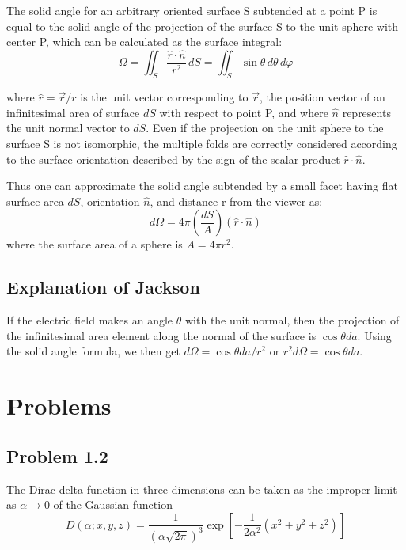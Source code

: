 The solid angle for an arbitrary oriented surface S subtended at a point P is equal to
the solid angle of the projection of the surface S to the unit sphere with center P,
which can be calculated as the surface integral:
$$
\Omega =\iint _{S} \frac{\hat{r}\cdot\hat{n}}{r^2} \,dS
= \iint_{S} \sin \theta \,d\theta \,d\varphi
$$

where $\hat{r} = \vec{r}/r$ is the unit vector corresponding to $\vec {r}$,
the position vector of an infinitesimal area of surface $dS$ with respect to point P,
and where $\hat{n}$ represents the unit normal vector to $dS$.
Even if the projection on the unit sphere to the surface S is not isomorphic,
the multiple folds are correctly considered according to the surface orientation
described by the sign of the scalar product $\hat{r}\cdot\hat{n}$.

Thus one can approximate the solid angle subtended by a small facet having flat surface area
$dS$, orientation $\hat{n}$, and distance r from the viewer as:
$$
d\Omega = 4\pi \left( \frac{dS}{A} \right) (\hat{r}\cdot\hat{n})
$$
where the surface area of a sphere is $A = 4\pi r^2$.


\subsection{Explanation of Jackson}

If the electric field makes an angle $\theta$ with the unit normal, then the projection of the
infinitesimal area element along the normal of the surface is $\cos\theta da$.
Using the solid angle formula, we then get $d\Omega = \cos\theta da / r^2$ or
$r^2 d\Omega = \cos\theta da$.



\section{Problems}

\subsection{Problem 1.2}
\label{jackson:problem-1.2}


The Dirac delta function in three dimensions can be taken as the improper limit as $\alpha \rightarrow 0$ of the
Gaussian function
$$
D\left(\alpha ; x, y, z \right) =
    \frac{1}{\left(\alpha \sqrt{2\pi}\right)^3}
    \exp{ \left[ -\frac{1}{2\alpha^2} \left( x^2 + y^2 + z^2 \right) \right] }
$$

